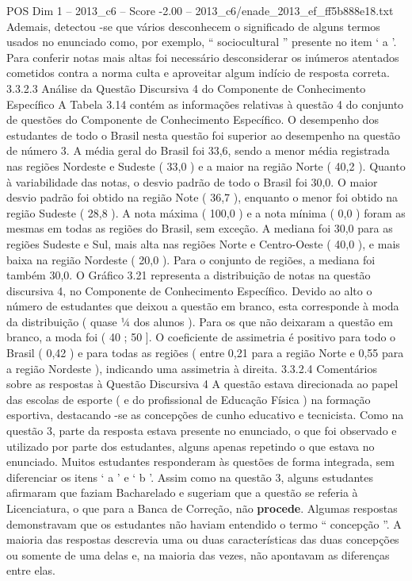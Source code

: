 \begin{textsample}{POS Dim 1 – 2013\_c6 – Score -2.00 – 2013\_c6/enade\_2013\_ef\_ff5b888e18.txt}
Ademais, detectou -se que vários desconhecem o significado de alguns termos usados no enunciado como, por exemplo, “ sociocultural ” presente no item ‘ a ’.
Para conferir notas mais altas foi necessário desconsiderar os inúmeros atentados cometidos contra a norma culta e aproveitar algum indício de resposta correta. 3.3.2.3 Análise da Questão Discursiva 4 do Componente de Conhecimento Específico A Tabela 3.14 contém as informações relativas à questão 4 do conjunto de questões do Componente de Conhecimento Específico.
O desempenho dos estudantes de todo o Brasil nesta questão foi superior ao desempenho na questão de número 3.
A média geral do Brasil foi 33,6, sendo a menor média registrada nas regiões Nordeste e Sudeste ( 33,0 ) e a maior na região Norte ( 40,2 ).
Quanto à variabilidade das notas, o desvio padrão de todo o Brasil foi 30,0.
O maior desvio padrão foi obtido na região Note ( 36,7 ), enquanto o menor foi obtido na região Sudeste ( 28,8 ).
A nota máxima ( 100,0 ) e a nota mínima ( 0,0 ) foram as mesmas em todas as regiões do Brasil, sem exceção.
A mediana foi 30,0 para as regiões Sudeste e Sul, mais alta nas regiões Norte e Centro-Oeste ( 40,0 ), e mais baixa na região Nordeste ( 20,0 ).
Para o conjunto de regiões, a mediana foi também 30,0.
O Gráfico 3.21 representa a distribuição de notas na questão discursiva 4, no Componente de Conhecimento Específico.
Devido ao alto o número de estudantes que deixou a questão em branco, esta corresponde à moda da distribuição ( quase ¼ dos alunos ).
Para os que não deixaram a questão em branco, a moda foi ( 40 ; 50 ].
O coeficiente de assimetria é positivo para todo o Brasil ( 0,42 ) e para todas as regiões ( entre 0,21 para a região Norte e 0,55 para a região Nordeste ), indicando uma assimetria à direita. 3.3.2.4 Comentários sobre as respostas à Questão Discursiva 4 A questão estava direcionada ao papel das escolas de esporte ( e do profissional de Educação Física ) na formação esportiva, destacando -se as concepções de cunho educativo e tecnicista.
Como na questão 3, parte da resposta estava presente no enunciado, o que foi observado e utilizado por parte dos estudantes, alguns apenas repetindo o que estava no enunciado.
Muitos estudantes responderam às questões de forma integrada, sem diferenciar os itens ‘ a ’ e ‘ b ’.
Assim como na questão 3, alguns estudantes afirmaram que faziam Bacharelado e sugeriam que a questão se referia à Licenciatura, o que para a Banca de Correção, não \textbf{procede}.
Algumas respostas demonstravam que os estudantes não haviam entendido o termo “ concepção ”.
A maioria das respostas descrevia uma ou duas características das duas concepções ou somente de uma delas e, na maioria das vezes, não apontavam as diferenças entre elas.

\end{textsample}
